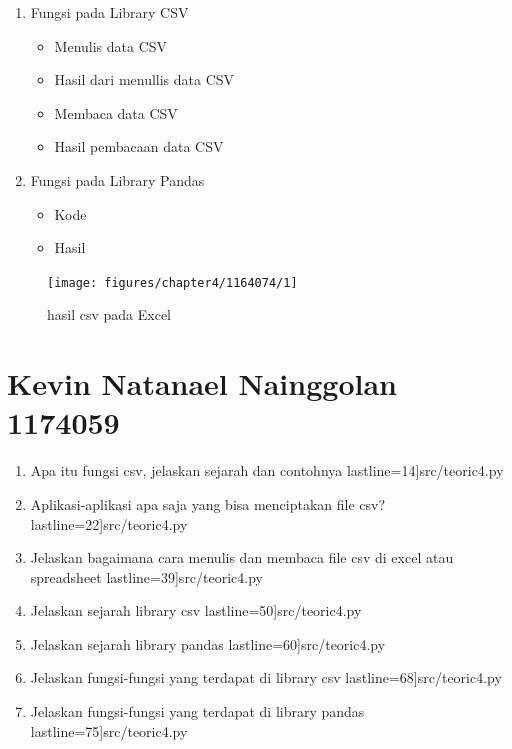 \begin{enumerate}
\item Fungsi pada Library CSV
\begin{itemize}
\item Menulis data CSV

\item Hasil dari menullis data CSV

\item Membaca data CSV

\item Hasil pembacaan data CSV

\end{itemize}

\item Fungsi pada Library Pandas
\begin{itemize}
\item Kode

\item Hasil

\end{itemize}
\end{enumerate}

\begin{figure}[!htbp]
	\centering
	\texttt{[image: figures/chapter4/1164074/1]}
	\caption{hasil csv pada Excel}
	\label{fig1}
\end{figure}

\section {Kevin Natanael Nainggolan 1174059}
	\begin {enumerate}
		\item Apa itu fungsi csv, jelaskan sejarah dan contohnya 
			 lastline=14]{src/teoric4.py}
		\item Aplikasi-aplikasi apa saja yang bisa menciptakan file csv? 
			 lastline=22]{src/teoric4.py}
		\item Jelaskan bagaimana cara menulis dan membaca file csv di excel atau spreadsheet
			 lastline=39]{src/teoric4.py}
		\item Jelaskan sejarah library csv
			 lastline=50]{src/teoric4.py}
		\item Jelaskan sejarah library pandas
			 lastline=60]{src/teoric4.py}
		\item Jelaskan fungsi-fungsi yang terdapat di library csv
			 lastline=68]{src/teoric4.py}
		\item Jelaskan fungsi-fungsi yang terdapat di library pandas
			 lastline=75]{src/teoric4.py}
	\end {enumerate}

